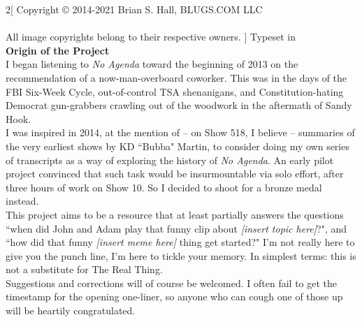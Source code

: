 \begin{multicols*}{2}[
Copyright © 2014-2021 Brian S. Hall, BLUGS.COM LLC\\\\
All image copyrights belong to their respective owners.
]
Typeset in \XeLaTeX\\

\textbf{Origin of the Project}\\

I began listening to \textit{No Agenda} toward the beginning of 2013 on the
recommendation of a now-man-overboard coworker. This was in the days of
the FBI Six-Week Cycle, out-of-control TSA shenanigans, and Constitution-hating
Democrat gun-grabbers crawling out of the woodwork in the aftermath
of Sandy Hook.\\

I was inspired in 2014, at the mention of -- on Show 518, I believe --
summaries of the very earliest shows by KD ``Bubba" Martin,
to consider doing my own series of transcripts
as a way of exploring the history of \textit{No Agenda}. An early pilot project
convinced that such task would be insurmountable via solo effort, after
three hours of work on Show 10. So I decided to shoot for
a bronze medal instead.\\

This project aims to be a resource that at least partially answers the
questions ``when did John and Adam play that funny clip about
\textit{[insert topic here]}?", and ``how did that funny
\textit{[insert meme here]} thing get started?"
I'm not really here to give you the punch line, I'm here to tickle your memory.
In simplest terms: this is not a substitute for The Real Thing.\\

Suggestions and corrections will of course be welcomed. I often fail to get
the timestamp for the opening one-liner, so anyone who can cough one of those
up will be heartily congratulated.


\end{multicols*}
